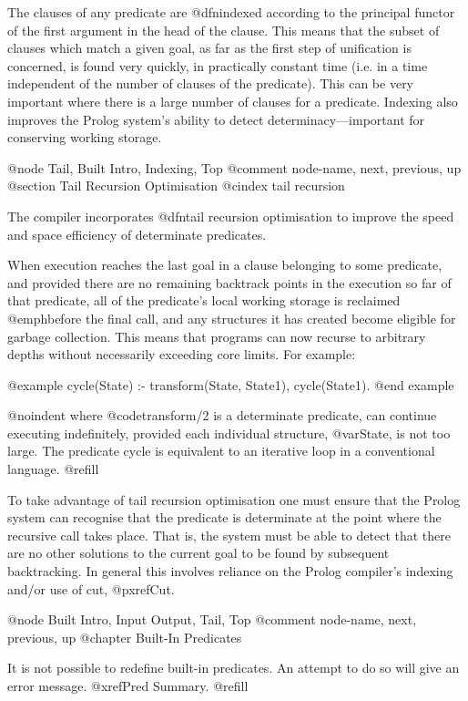 The clauses of any predicate are @dfn{indexed} according to the
principal functor of the first argument in the head of the clause.  This
means that the subset of clauses which match a given goal, as far as the
first step of unification is concerned, is found very quickly, in
practically constant time (i.e. in a time independent of the number of
clauses of the predicate).  This can be very important where there is a
large number of clauses for a predicate.  Indexing also improves the
Prolog system's ability to detect determinacy---important for conserving
working storage.

@node Tail, Built Intro, Indexing, Top
@comment  node-name,  next,  previous,  up
@section Tail Recursion Optimisation
@cindex tail recursion

The compiler incorporates @dfn{tail recursion optimisation} to improve the
speed and space efficiency of determinate predicates.

When execution reaches the last goal in a clause belonging to some
predicate, and provided there are no remaining backtrack points in the
execution so far of that predicate, all of the predicate's local working
storage is reclaimed @emph{before} the final call, and any structures it
has created become eligible for garbage collection.  This means that
programs can now recurse to arbitrary depths without necessarily
exceeding core limits.  For example:

@example
cycle(State) :- transform(State, State1), cycle(State1).
@end example

@noindent
where @code{transform/2} is a determinate predicate, can continue
executing indefinitely, provided each individual structure, @var{State},
is not too large.  The predicate cycle is equivalent to an iterative
loop in a conventional language. @refill

To take advantage of tail recursion optimisation one must ensure that
the Prolog system can recognise that the predicate is determinate at the
point where the recursive call takes place.  That is, the system must be
able to detect that there are no other solutions to the current goal to
be found by subsequent backtracking.  In general this involves reliance
on the Prolog compiler's indexing and/or use of cut, @pxref{Cut}.

@node Built Intro, Input Output, Tail, Top
@comment  node-name,  next,  previous,  up
@chapter Built-In Predicates

It is not possible to redefine built-in predicates.  An attempt to do so
will give an error message.  @xref{Pred Summary}. @refill


